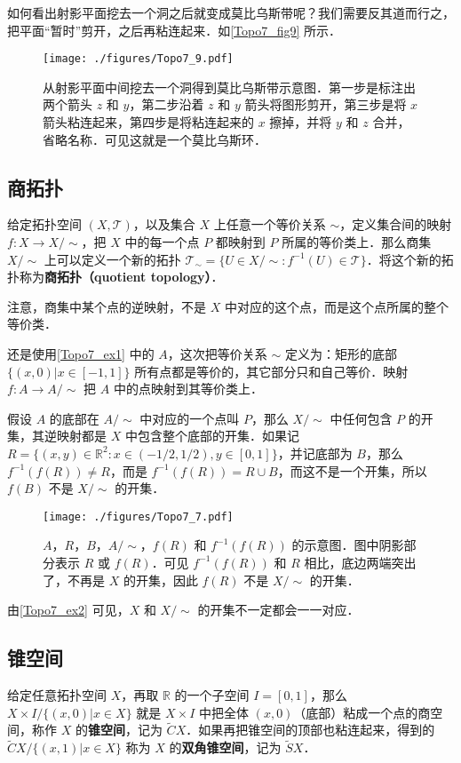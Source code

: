 如何看出射影平面挖去一个洞之后就变成莫比乌斯带呢？我们需要反其道而行之，把平面“暂时”剪开，之后再粘连起来．如\autoref{Topo7_fig9} 所示．

\begin{figure}[ht]
\centering
\texttt{[image: ./figures/Topo7\_9.pdf]}
\caption{从射影平面中间挖去一个洞得到莫比乌斯带示意图．第一步是标注出两个箭头 $z$ 和 $y$，第二步沿着 $z$ 和 $y$ 箭头将图形剪开，第三步是将 $x$ 箭头粘连起来，第四步是将粘连起来的 $x$ 擦掉，并将 $y$ 和 $z$ 合并，省略名称．可见这就是一个莫比乌斯环．} \label{Topo7_fig9}
\end{figure}

\subsection{商拓扑}

给定拓扑空间 $(X, \mathcal{T})$，以及集合 $X$ 上任意一个等价关系 $\sim$，定义集合间的映射 $f:X\rightarrow X/\sim$，把 $X$ 中的每一个点 $P$ 都映射到 $P$ 所属的等价类上．那么商集 $X/\sim$ 上可以定义一个新的拓扑 $\mathcal{T}_\sim=\{U\in X/\sim: f^{-1}(U)\in\mathcal{T}\}$．将这个新的拓扑称为\textbf{商拓扑（quotient topology）}．

注意，商集中某个点的逆映射，不是 $X$ 中对应的这个点，而是这个点所属的整个等价类．

\begin{example}{}\label{Topo7_ex2}

还是使用\autoref{Topo7_ex1} 中的 $A$，这次把等价关系 $\sim$ 定义为：矩形的底部 $\{(x,0)|x\in[-1,1]\}$ 所有点都是等价的，其它部分只和自己等价．映射 $f:A\rightarrow A/\sim$ 把 $A$ 中的点映射到其等价类上．

假设 $A$ 的底部在 $A/\sim$ 中对应的一个点叫 $P$，那么 $X/\sim$ 中任何包含 $P$ 的开集，其逆映射都是 $X$ 中包含整个底部的开集．如果记 $R=\{(x,y)\in\mathbb{R}^2:x\in(-1/2,1/2),y\in[0,1]\}$，并记底部为 $B$，那么 $f^{-1}(f(R))\not=R$，而是 $f^{-1}(f(R))=R\cup B$，而这不是一个开集，所以 $f(B)$ 不是 $X/\sim$ 的开集．


\begin{figure}[ht]
\centering
\texttt{[image: ./figures/Topo7\_7.pdf]}
\caption{$A$，$R$，$B$，$A/\sim$，$f(R)$ 和 $f^{-1}(f(R))$ 的示意图．图中阴影部分表示 $R$ 或 $f(R)$．可见 $f^{-1}(f(R))$ 和 $R$ 相比，底边两端突出了，不再是 $X$ 的开集，因此 $f(R)$ 不是 $X/\sim$ 的开集．} \label{Topo7_fig7}
\end{figure}

\end{example}

由\autoref{Topo7_ex2} 可见，$X$ 和 $X/\sim$ 的开集不一定都会一一对应．

\subsection{锥空间}

给定任意拓扑空间 $X$，再取 $\mathbb{R}$ 的一个子空间 $I=[0,1]$，那么 $X\times I/\{(x,0)|x\in X\}$ 就是 $X\times I$ 中把全体 $(x, 0)$（底部）粘成一个点的商空间，称作 $X$ 的\textbf{锥空间}，记为 $\widetilde{C}X$．如果再把锥空间的顶部也粘连起来，得到的 $\widetilde{C}X/\{(x,1)|x\in X\}$ 称为 $X$ 的\textbf{双角锥空间}，记为 $\widetilde{S}X$．

